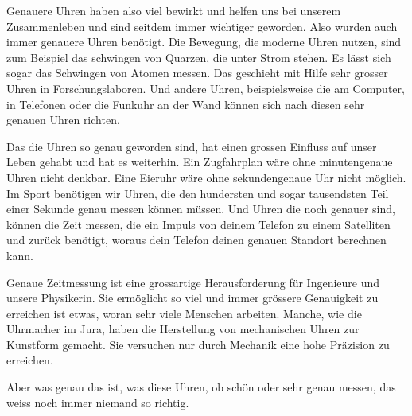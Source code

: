 Genauere Uhren haben also viel bewirkt und helfen uns bei unserem Zusammenleben
und sind seitdem immer wichtiger geworden. Also wurden auch immer genauere
Uhren benötigt. Die Bewegung, die moderne Uhren nutzen, sind zum Beispiel das
schwingen von Quarzen, die unter Strom stehen. Es lässt sich sogar das
Schwingen von Atomen messen. Das geschieht mit Hilfe sehr grosser Uhren in
Forschungslaboren. Und andere Uhren, beispielsweise die am Computer, in
Telefonen oder die Funkuhr an der Wand können sich nach diesen sehr genauen
Uhren richten. 

Das die Uhren so genau geworden sind, hat einen grossen Einfluss auf unser
Leben gehabt und hat es weiterhin. Ein Zugfahrplan wäre ohne minutengenaue
Uhren nicht denkbar. Eine Eieruhr wäre ohne sekundengenaue Uhr nicht möglich.
Im Sport benötigen wir Uhren, die den hundersten und sogar tausendsten Teil
einer Sekunde genau messen können müssen. Und Uhren die noch genauer sind,
können die Zeit messen, die ein Impuls von deinem Telefon zu einem Satelliten
und zurück benötigt, woraus dein Telefon deinen genauen Standort berechnen
kann. 

Genaue Zeitmessung ist eine grossartige Herausforderung für Ingenieure und
unsere Physikerin. Sie ermöglicht so viel und immer grössere Genauigkeit zu
erreichen ist etwas, woran sehr viele Menschen arbeiten. Manche, wie die
Uhrmacher im Jura, haben die Herstellung von mechanischen Uhren zur Kunstform
gemacht. Sie versuchen nur durch Mechanik eine hohe Präzision zu erreichen. 

Aber was genau das ist, was diese Uhren, ob schön oder sehr genau messen, das
weiss noch immer niemand so richtig.
\vfill


